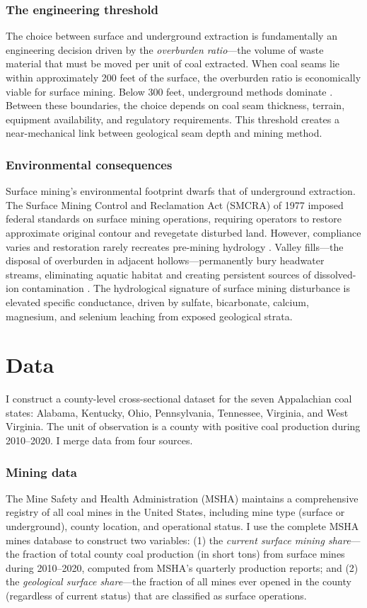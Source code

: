 \documentclass[12pt]{article}
\begin{document}
\subsubsection*{The engineering threshold} The choice between surface and underground extraction is fundamentally an engineering decision driven by the \textit{overburden ratio}---the volume of waste material that must be moved per unit of coal extracted. When coal seams lie within approximately 200 feet of the surface, the overburden ratio is economically viable for surface mining. Below 300 feet, underground methods dominate \citep{carlson2006statistical}. Between these boundaries, the choice depends on coal seam thickness, terrain, equipment availability, and regulatory requirements. This threshold creates a near-mechanical link between geological seam depth and mining method.

\subsubsection*{Environmental consequences} Surface mining's environmental footprint dwarfs that of underground extraction. The Surface Mining Control and Reclamation Act (SMCRA) of 1977 imposed federal standards on surface mining operations, requiring operators to restore approximate original contour and revegetate disturbed land. However, compliance varies and restoration rarely recreates pre-mining hydrology \citep{zipper2011restoring}. Valley fills---the disposal of overburden in adjacent hollows---permanently bury headwater streams, eliminating aquatic habitat and creating persistent sources of dissolved-ion contamination \citep{bernhardt2012synthetic}. The hydrological signature of surface mining disturbance is elevated specific conductance, driven by sulfate, bicarbonate, calcium, magnesium, and selenium leaching from exposed geological strata.


\section{Data}
\label{sec:data}

I construct a county-level cross-sectional dataset for the seven Appalachian coal states: Alabama, Kentucky, Ohio, Pennsylvania, Tennessee, Virginia, and West Virginia. The unit of observation is a county with positive coal production during 2010--2020. I merge data from four sources.

\subsubsection*{Mining data} The Mine Safety and Health Administration (MSHA) maintains a comprehensive registry of all coal mines in the United States, including mine type (surface or underground), county location, and operational status. I use the complete MSHA mines database to construct two variables: (1) the \textit{current surface mining share}---the fraction of total county coal production (in short tons) from surface mines during 2010--2020, computed from MSHA's quarterly production reports; and (2) the \textit{geological surface share}---the fraction of all mines ever opened in the county (regardless of current status) that are classified as surface operations.
\end{document}
